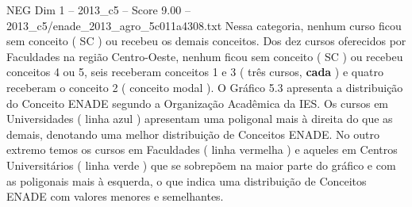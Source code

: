 \begin{textsample}{NEG Dim 1 – 2013\_c5 – Score 9.00 – 2013\_c5/enade\_2013\_agro\_5c011a4308.txt}
Nessa categoria, nenhum curso ficou sem conceito ( SC ) ou recebeu os demais conceitos.
Dos dez cursos oferecidos por Faculdades na região Centro-Oeste, nenhum ficou sem conceito ( SC ) ou recebeu conceitos 4 ou 5, seis receberam conceitos 1 e 3 ( três cursos, \textbf{cada} ) e quatro receberam o conceito 2 ( conceito modal ).
O Gráfico 5.3 apresenta a distribuição do Conceito ENADE segundo a Organização Acadêmica da IES.
Os cursos em Universidades ( linha azul ) apresentam uma poligonal mais à direita do que as demais, denotando uma melhor distribuição de Conceitos ENADE.
No outro extremo temos os cursos em Faculdades ( linha vermelha ) e aqueles em Centros Universitários ( linha verde ) que se sobrepõem na maior parte do gráfico e com as poligonais mais à esquerda, o que indica uma distribuição de Conceitos ENADE com valores menores e semelhantes.

\end{textsample}
